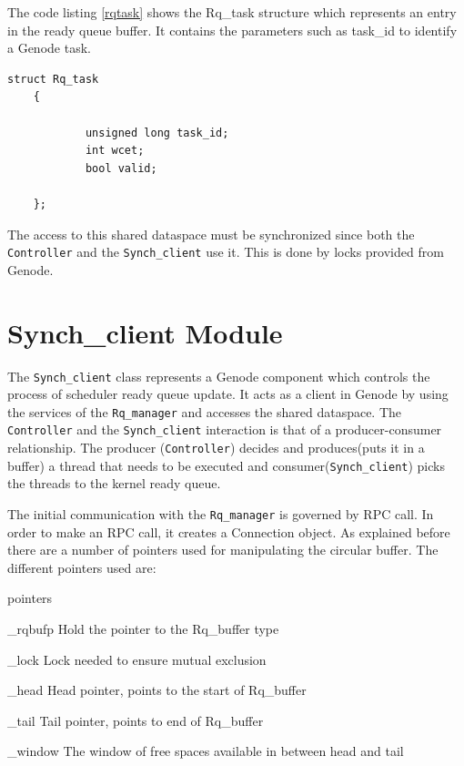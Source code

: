 The code listing \ref{rqtask} shows the Rq\_task structure which represents an entry in the ready queue buffer. It contains the parameters such as task\_id to identify a Genode task.

\begin{lstlisting}[caption={Rq\_task structure},label={rqtask}, style=customcpp]
 struct Rq_task
 	{
 
			unsigned long task_id;
 			int wcet;
 			bool valid;
 
 	};
\end{lstlisting}

The access to this shared dataspace must be synchronized since both the \texttt{Controller} and the \texttt{Synch\_client} use  it. This is done by locks provided from Genode.

\section{Synch\_client Module}
The \texttt{Synch\_client} class represents a Genode component which controls the process of scheduler ready queue update. It acts as a client in Genode by using the services of the \texttt{Rq\_manager} and accesses the shared dataspace. The \texttt{Controller} and the \texttt{Synch\_client} interaction is that of a producer-consumer relationship. The producer (\texttt{Controller}) decides and produces(puts it in a buffer) a thread that needs to be executed and consumer(\texttt{Synch\_client}) picks the threads to the kernel ready queue.

The initial communication with the \texttt{Rq\_manager} is governed by RPC call. In order to make an RPC call, it creates a Connection object. As explained before there are a number of pointers used for manipulating the circular buffer. The different pointers used are:

\begin{labeling}{pointers}
	\item [\_rqbufp] Hold the pointer to the Rq\_buffer type
	\item [\_lock] Lock needed to ensure mutual exclusion
	\item [\_head] Head pointer, points to the start of Rq\_buffer
	\item [\_tail] Tail pointer, points to end of Rq\_buffer
	\item [\_window] The window of free spaces available in between head and tail
\end{labeling}
 
